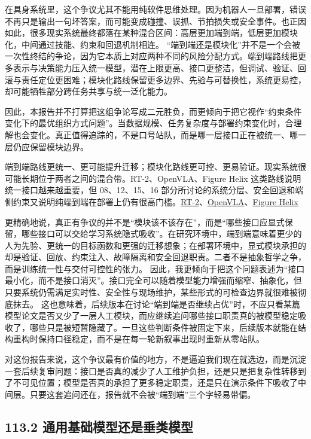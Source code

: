 在具身系统里，这个争议尤其不能用纯软件思维处理。因为机器人一旦部署，错误不再只是输出一句坏答案，而可能变成碰撞、误抓、节拍损失或安全事件。也正因如此，很多现实系统最终都落在某种混合区间：高层更加端到端，低层更加模块化，中间通过技能、约束和回退机制相连。 “端到端还是模块化”并不是一个会被一次性终结的争论，因为它本质上对应两种不同的风险分配方式。端到端路线把更多表示与决策能力压入统一模型，潜在上限更高、接口更整洁，但调试、验证、回滚与责任定位更困难；模块化路线保留更多边界、先验与可替换性，系统更易控，却可能牺牲部分跨任务共享与统一泛化能力。

因此，本报告并不打算把这组争论写成二元胜负，而更倾向于把它视作“约束条件变化下的最优组织方式问题”。当数据规模、任务复杂度与部署约束变化时，合理解也会变化。真正值得追踪的，不是口号站队，而是哪一层接口正在被统一、哪一层仍应保留模块边界。

端到端路线更统一、更可能提升迁移；模块化路线更可控、更易验证。现实系统很可能长期位于两者之间的混合带。RT-2、OpenVLA、Figure Helix 这类路线说明统一接口越来越重要，但 08、12、15、16 部分所讨论的系统分层、安全回退和端侧约束又说明纯端到端在部署上仍有很高门槛。\href{https://arxiv.org/abs/2307.15818}{RT-2}、\href{https://arxiv.org/abs/2406.09246}{OpenVLA}、\href{https://www.figure.ai/news/helix}{Figure Helix}

更精确地说，真正有争议的并不是“模块该不该存在”，而是“哪些接口应显式保留，哪些接口可以交给学习系统隐式吸收”。在研究环境中，端到端意味着更少的人为先验、更统一的目标函数和更强的迁移想象；在部署环境中，显式模块承担的却是验证、回放、约束注入、故障隔离和安全回退职责。二者不是抽象哲学之争，而是训练统一性与交付可控性的张力。 因此，我更倾向于把这个问题表述为“接口最小化，而不是接口消灭”。接口完全可以随着模型能力增强而缩窄、抽象化，但只要系统仍需满足实时性、安全性与现场维护，某些形式的可检查边界就很难被彻底抹去。 这也意味着，后续版本在讨论“端到端是否继续占优”时，不应只看某篇模型论文是否又少了一层人工模块，而应继续追问哪些接口职责真的被模型稳定吸收了，哪些只是被短暂隐藏了。一旦这些判断条件被固定下来，后续版本就能在结构重构时保持口径稳定，而不是在每一轮新叙事出现时重新从零站队。

对这份报告来说，这个争议最有价值的地方，不是逼迫我们现在就选边，而是沉淀一套后续复审问题：接口是否真的减少了人工维护负担，还是只是把复杂性转移到了不可见位置；模型是否真的承担了更多稳定职责，还是只在演示条件下吸收了中间层。只要这套追问还在，报告就不会被“端到端”三个字轻易带偏。

\subsection*{113.2 通用基础模型还是垂类模型}


